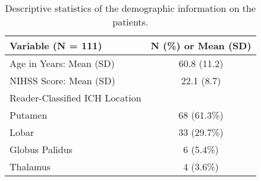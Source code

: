 \begin{table}[ht]
\centering
\begin{tabular}{lc}
  \hline {\bf Variable (N = 111)} & {\bf N (\%) or Mean (SD)} \\ 
  \hline
Age in Years: Mean (SD) & 60.8 (11.2) \\ 
   \hline
NIHSS Score: Mean (SD) & 22.1 (8.7) \\ 
   \hline
Reader-Classified ICH Location &  \\ 
   \hline
\text{  } Putamen & 68 (61.3\%) \\ 
   \hline
\text{  } Lobar & 33 (29.7\%) \\ 
   \hline
\text{  } Globus Palidus & 6 (5.4\%) \\ 
   \hline
\text{  } Thalamus & 4 (3.6\%) \\ 
   \hline
\end{tabular}
\caption{Descriptive statistics of the demographic information on the patients.} 
\label{t:dem}
\end{table}
